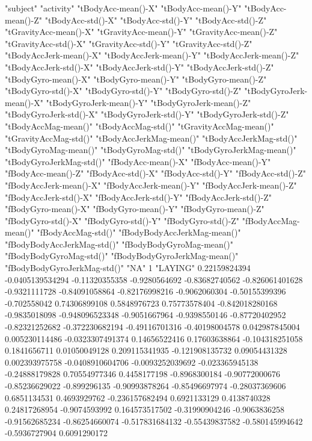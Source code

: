 "subject" "activity" "tBodyAcc-mean()-X" "tBodyAcc-mean()-Y" "tBodyAcc-mean()-Z" "tBodyAcc-std()-X" "tBodyAcc-std()-Y" "tBodyAcc-std()-Z" "tGravityAcc-mean()-X" "tGravityAcc-mean()-Y" "tGravityAcc-mean()-Z" "tGravityAcc-std()-X" "tGravityAcc-std()-Y" "tGravityAcc-std()-Z" "tBodyAccJerk-mean()-X" "tBodyAccJerk-mean()-Y" "tBodyAccJerk-mean()-Z" "tBodyAccJerk-std()-X" "tBodyAccJerk-std()-Y" "tBodyAccJerk-std()-Z" "tBodyGyro-mean()-X" "tBodyGyro-mean()-Y" "tBodyGyro-mean()-Z" "tBodyGyro-std()-X" "tBodyGyro-std()-Y" "tBodyGyro-std()-Z" "tBodyGyroJerk-mean()-X" "tBodyGyroJerk-mean()-Y" "tBodyGyroJerk-mean()-Z" "tBodyGyroJerk-std()-X" "tBodyGyroJerk-std()-Y" "tBodyGyroJerk-std()-Z" "tBodyAccMag-mean()" "tBodyAccMag-std()" "tGravityAccMag-mean()" "tGravityAccMag-std()" "tBodyAccJerkMag-mean()" "tBodyAccJerkMag-std()" "tBodyGyroMag-mean()" "tBodyGyroMag-std()" "tBodyGyroJerkMag-mean()" "tBodyGyroJerkMag-std()" "fBodyAcc-mean()-X" "fBodyAcc-mean()-Y" "fBodyAcc-mean()-Z" "fBodyAcc-std()-X" "fBodyAcc-std()-Y" "fBodyAcc-std()-Z" "fBodyAccJerk-mean()-X" "fBodyAccJerk-mean()-Y" "fBodyAccJerk-mean()-Z" "fBodyAccJerk-std()-X" "fBodyAccJerk-std()-Y" "fBodyAccJerk-std()-Z" "fBodyGyro-mean()-X" "fBodyGyro-mean()-Y" "fBodyGyro-mean()-Z" "fBodyGyro-std()-X" "fBodyGyro-std()-Y" "fBodyGyro-std()-Z" "fBodyAccMag-mean()" "fBodyAccMag-std()" "fBodyBodyAccJerkMag-mean()" "fBodyBodyAccJerkMag-std()" "fBodyBodyGyroMag-mean()" "fBodyBodyGyroMag-std()" "fBodyBodyGyroJerkMag-mean()" "fBodyBodyGyroJerkMag-std()" "NA"
1 "LAYING" 0.22159824394 -0.0405139534294 -0.11320355358 -0.9280564692 -0.83682740562 -0.826061401628 -0.9321111728 -0.84091058864 -0.82176998216 -0.9062060304 -0.50155399396 -0.702558042 0.74306899108 0.5848976723 0.75773578404 -0.842018280168 -0.9835018098 -0.948096523348 -0.9051667964 -0.9398550146 -0.87720402952 -0.82321252682 -0.372230682194 -0.49116701316 -0.40198004578 0.042987845004 0.005230114486 -0.0323307491374 0.14656522416 0.17603638864 -0.104318251058 0.1841656711 0.01050049128 0.209115341935 -0.121908135732 0.09054431328 0.002393975758 -0.0408910604706 -0.0093252039692 -0.023365945138 -0.24888179828 0.70554977346 0.4458177198 -0.8968300184 -0.90772000676 -0.85236629022 -0.899296135 -0.90993878264 -0.85496697974 -0.28037369606 0.6851134531 0.4693929762 -0.236157682494 0.6921133129 0.4138740328 0.24817268954 -0.9074593992 0.164573517502 -0.31990904246 -0.9063836258 -0.91562685234 -0.86254660074 -0.517831684132 -0.55439837582 -0.580145994642 -0.5936727904 0.6091290172
